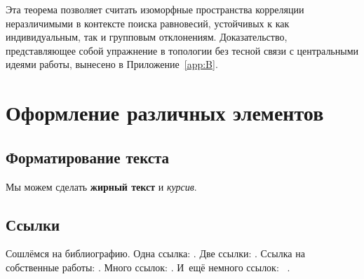 Эта теорема позволяет считать изоморфные пространства корреляции неразличимыми в контексте поиска равновесий, устойчивых к как индивидуальным, так и групповым отклонениям. Доказательство, представляющее собой упражнение в топологии без тесной связи с центральными идеями работы, вынесено в Приложение~\cref{app:B}.

\chapter{Оформление различных элементов}

\section{Форматирование текста}

Мы можем сделать \textbf{жирный текст} и \textit{курсив}.

\section{Ссылки}

Сошлёмся на библиографию.
Одна ссылка: \cite[с.~54]{Sokolov}\cite[с.~36]{Gaidaenko}.
Две ссылки: \cite{Sokolov,Gaidaenko}.
Ссылка на собственные работы: \cite{vakbib1, confbib2}.
Много ссылок: %
\cite{Lermontov, Management, Borozda, Marketing, Constitution, FamilyCode,
    Gost.7.0.53, Razumovski, Lagkueva, Pokrovski, Methodology, Berestova,
    Kriger}%
%
.
И~ещё немного ссылок:~\cite{Article,Book,Booklet,Conference,Inbook,Incollection,Manual,Mastersthesis,
    Misc,Phdthesis,Proceedings,Techreport,Unpublished}
\cite{medvedev2006jelektronnye, CEAT:CEAT581, doi:10.1080/01932691.2010.513279,
    Gosele1999161,Li2007StressAnalysis, Shoji199895, test:eisner-sample,
    test:eisner-sample-shorted, AB_patent_Pomerantz_1968, iofis_patent1960}%
%
.

